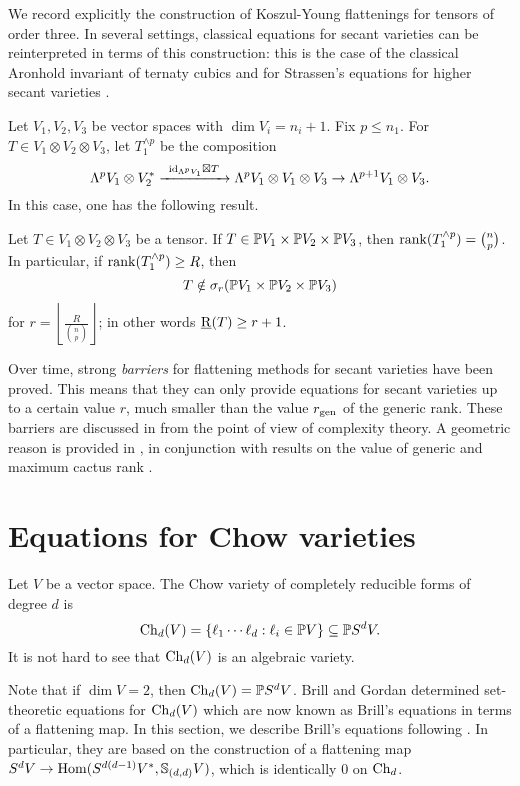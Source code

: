 We record explicitly the construction of Koszul-Young flattenings for tensors of order three. In several settings, classical equations for secant varieties can be reinterpreted in terms of this construction: this is the case of the classical Aronhold invariant of ternaty cubics \cite[Prop. 4.4.7]{Stu93} and for Strassen's equations for higher secant varieties \cite{Str83,LO13}.

Let $V_1,V_2,V_3$ be vector spaces with $\dim V_i = n_i+1$. Fix $p \leq n_1$. For $T \in V_1 \otimes V_2 \otimes V_3$, let $T_1^{\wedge p} $ be the composition
\[
\Lambda^p V_1 \otimes V_2^*  \xto{\id_{\Lambda^p V_1} \boxtimes T} \Lambda^p V_1 \otimes V_1 \otimes V_3 \to \Lambda^{p+1} V_1 \otimes V_3.
\]
In this case, one has the following result.
\begin{proposition}
 \label{RepTheory-proposition-KoszulFlat}
 Let $T \in V_1 \otimes V_2 \otimes V_3$ be a tensor. If $T \in \mathbb{P} V_1 \times \mathbb{P} V_2 \times \mathbb{P} V_3$, then $\mathrm{rank}( T_1^{\wedge p}) = \binom{n}{p}$. In particular, if $\mathrm{rank} ( T_1^{\wedge p} ) \geq R$, then 
 \[
T \notin \sigma_r ( \mathbb{P} V_1 \times \mathbb{P} V_2 \times \mathbb{P} V_3) 
 \]
 for $r = \left \lfloor \frac{R}{\binom{n}{p}} \right \rfloor$; in other words $\underline{\mathrm{R}}(T) \geq r+1$.
\end{proposition}



Over time, strong \emph{barriers} for flattening methods for secant varieties have been proved. This means that they can only provide equations for secant varieties up to a certain value $r$, much smaller than the value $r_{\mathrm{gen}}$ of the generic rank. These barriers are discussed in \cite{EGOW18} from the point of view of complexity theory. A geometric reason is provided in \cite{Gal17}, in conjunction with results on the value of generic and maximum cactus rank \cite{BR13,BBG19}. 




\section{Equations for Chow varieties}
\label{RepTheory-section-chowvarieties}

Let $V$ be a vector space. The Chow variety of completely reducible forms of degree $d$ is
\[
\mathrm{Ch}_d(V) = \{ \ell_1 \cdots \ell_d : \ell_i \in \mathbb{P} V\} \subseteq \mathbb{P} S^d V.
\]
It is not hard to see that $\mathrm{Ch}_d(V)$ is an algebraic variety. 

Note that if $\dim V = 2$, then $\mathrm{Ch}_d(V) = \mathbb{P} S^d V$. Brill \cite{Bri98} and Gordan \cite{Gor94} determined set-theoretic equations for $\mathrm{Ch}_d(V)$ which are now known as Brill's equations in terms of a flattening map. In this section, we describe Brill's equations following \cite{Lan12,Gua18}. In particular, they are based on the construction of a flattening map $S^d V \to \operatorname{Hom}(S^{d(d-1)} V^*, \mathbb{S}_{(d,d)} V )$, which is identically $0$ on $\mathrm{Ch}_d$. 

